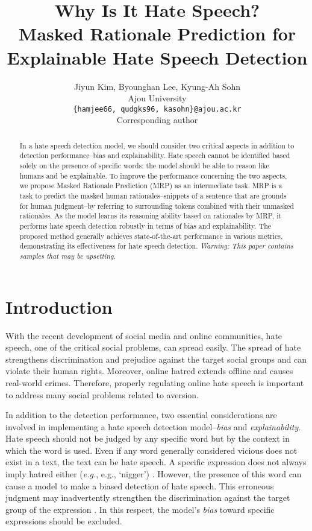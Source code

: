 \documentclass[11pt]{article}
\title{Why Is It Hate Speech? \\Masked Rationale Prediction for Explainable Hate Speech Detection}
\author{Jiyun Kim, Byounghan Lee, Kyung-Ah Sohn \\
  Ajou University \\
  \texttt{\{hamjee66, qudgks96, kasohn\}@ajou.ac.kr} \\Corresponding author \\
}
\newcommand{\eg}{\textit{e.g.}}
\begin{document}
\maketitle 









\begin{abstract}

In a hate speech detection model, we should consider two critical aspects in addition to detection performance--bias and explainability. Hate speech cannot be identified based solely on the presence of specific words: the model should be able to reason like humans and be explainable. To improve the performance concerning the two aspects, we propose Masked Rationale Prediction (MRP) as an intermediate task. MRP is a task to predict the masked human rationales--snippets of a sentence that are grounds for human judgment--by referring to surrounding tokens combined with their unmasked rationales. As the model learns its reasoning ability based on rationales by MRP, it performs hate speech detection robustly in terms of bias and explainability. The proposed method generally achieves state-of-the-art performance in various metrics, demonstrating its effectiveness for hate speech detection. \textit{Warning: This paper contains samples that may be upsetting.}


\end{abstract}


\section{Introduction}

With the recent development of social media and online communities, hate speech, one of the critical social problems, can spread easily. The spread of hate strengthens discrimination and prejudice against the target social groups and can violate their human rights. Moreover, online hatred extends offline and causes real-world crimes. Therefore, properly regulating online hate speech is important to address many social problems related to aversion.  

In addition to the detection performance, two essential considerations are involved in implementing a hate speech detection model--\textit{bias} and \textit{explainability}. Hate speech should not be judged by any specific word but by the context in which the word is used. Even if any word generally considered vicious does not exist in a text, the text can be hate speech. A specific expression does not always imply hatred either (\eg, e.g., `nigger') \citep{del2017hate}. However, the presence of this word can cause a model to make a biased detection of hate speech. This erroneous judgment may inadvertently strengthen the discrimination against the target group of the expression \citep{sap2019risk, davidson2019racial}. In this respect, the model's \textit{bias} toward specific expressions should be excluded.
\end{document}

